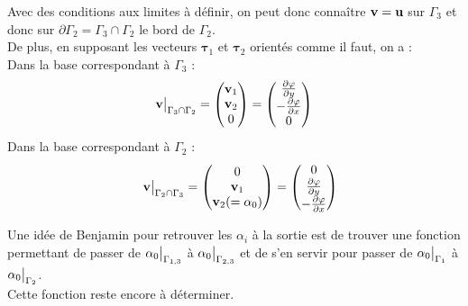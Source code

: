 \documentclass[a4paper,11pt]{article}
\begin{document}
Avec des conditions aux limites à définir, on peut donc connaître ${\mathbf{v}}={\mathbf{u}}$ sur $\Gamma_3$ et donc sur $\partial\Gamma_2 = \Gamma_3\cap\Gamma_2$ le bord de $\Gamma_2$.\\

De plus, en supposant les vecteurs $\bm{\tau}_1$ et $\bm{\tau}_2$ orientés comme il faut, on a :\\
Dans la base correspondant à $\Gamma_3$ :
\[
{\mathbf{v}}{\big\rvert_{\Gamma_3\cap\Gamma_2}} =
\begin{pmatrix}
  {\mathbf{v}}_1\\{\mathbf{v}}_2\\0
\end{pmatrix}=
\begin{pmatrix}
  \frac{\partial\varphi}{\partial y}\\-\frac{\partial\varphi}{\partial x}\\0
\end{pmatrix}
\]
Dans la base correspondant à $\Gamma_2$ :
\[
\quad{\mathbf{v}}{\big\rvert_{\Gamma_2\cap\Gamma_3}} =
\begin{pmatrix}
  0\\{\mathbf{v}}_1\\{\mathbf{v}}_2(=\alpha_0)
\end{pmatrix} =
\begin{pmatrix}
  0\\\frac{\partial\varphi}{\partial y}\\-\frac{\partial\varphi}{\partial x}
\end{pmatrix}
\]

Une idée de Benjamin pour retrouver les $\alpha_i$ à la sortie est de trouver une fonction permettant de passer de $\alpha_0{\big\rvert_{\Gamma_{1,3}}}$ à $\alpha_0{\big\rvert_{\Gamma_{2,3}}}$ et de s'en servir pour passer de $\alpha_0{\big\rvert_{\Gamma_1}}$ à $\alpha_0{\big\rvert_{\Gamma_2}}$.\\
Cette fonction reste encore à déterminer.
\end{document}
